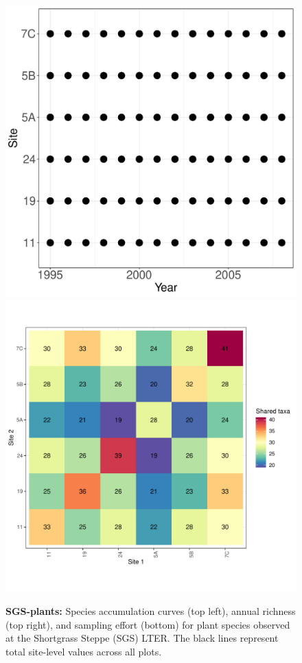 \documentclass[11pt, oneside]{article}
\begin{document}
\begin{figure}[h!]
\includegraphics[scale = 0.4]{sgs-plants-compagnoni_spatiotemporal_sampling_effort.pdf}
\includegraphics[scale = 0.4]{sgs-plants-compagnoni_spp_shared.pdf}
\caption{{\bf SGS-plants:} Species accumulation curves (top left),  annual richness (top right), and sampling effort (bottom)  for plant species observed at the Shortgrass Steppe (SGS) LTER. The black lines represent total site-level values across all plots.}
\label{sgs-plants-compagnoni}
\end{figure}
\end{document}
